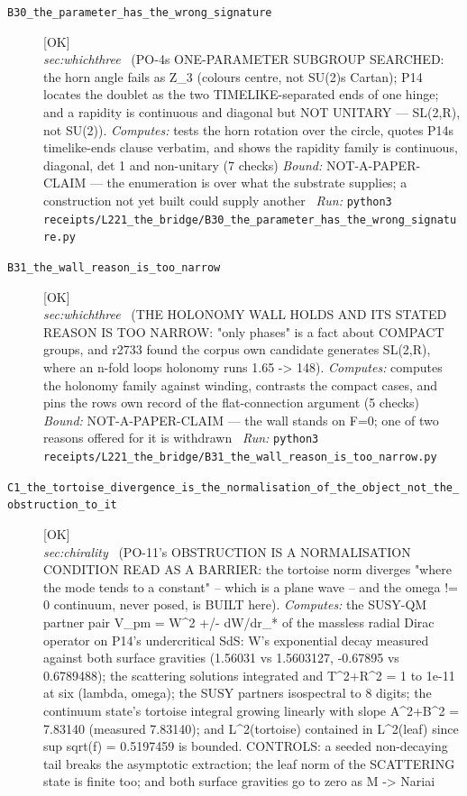 \begin{description}
\item[\label{rcpt:B30_the_parameter_has_the_wrong_signature}\texttt{B30\_the\_parameter\_has\_the\_wrong\_signature}]\hfill\textsf{[OK]}\\
\textit{sec:whichthree} \ (PO-4s ONE-PARAMETER SUBGROUP SEARCHED: the horn angle fails as Z\_3 (colours centre, not SU(2)s Cartan); P14 locates the doublet as the two TIMELIKE-separated ends of one hinge; and a rapidity is continuous and diagonal but NOT UNITARY --- SL(2,R), not SU(2)). 
\emph{Computes:} tests the horn rotation over the circle, quotes P14s timelike-ends clause verbatim, and shows the rapidity family is continuous, diagonal, det 1 and non-unitary (7 checks)
 \emph{Bound:} NOT-A-PAPER-CLAIM --- the enumeration is over what the substrate supplies; a construction not yet built could supply another
\ \emph{Run:} \texttt{python3 receipts/L221\_the\_bridge/B30\_the\_parameter\_has\_the\_wrong\_signature.py}
\item[\label{rcpt:B31_the_wall_reason_is_too_narrow}\texttt{B31\_the\_wall\_reason\_is\_too\_narrow}]\hfill\textsf{[OK]}\\
\textit{sec:whichthree} \ (THE HOLONOMY WALL HOLDS AND ITS STATED REASON IS TOO NARROW: "only phases" is a fact about COMPACT groups, and r2733 found the corpus own candidate generates SL(2,R), where an n-fold loops holonomy runs 1.65 -> 148). 
\emph{Computes:} computes the holonomy family against winding, contrasts the compact cases, and pins the rows own record of the flat-connection argument (5 checks)
 \emph{Bound:} NOT-A-PAPER-CLAIM --- the wall stands on F=0; one of two reasons offered for it is withdrawn
\ \emph{Run:} \texttt{python3 receipts/L221\_the\_bridge/B31\_the\_wall\_reason\_is\_too\_narrow.py}
\item[\label{rcpt:C1_the_tortoise_divergence_is_the_normalisation_of_the_object_not_the_obstruction_to_it}\texttt{C1\_the\_tortoise\_divergence\_is\_the\_normalisation\_of\_the\_object\_not\_the\_obstruction\_to\_it}]\hfill\textsf{[OK]}\\
\textit{sec:chirality} \ (PO-11's OBSTRUCTION IS A NORMALISATION CONDITION READ AS A BARRIER: the tortoise norm diverges "where the mode tends to a constant" -- which is a plane wave -- and the omega != 0 continuum, never posed, is BUILT here). 
\emph{Computes:} the SUSY-QM partner pair V\_pm = W\textasciicircum{}2 +/- dW/dr\_* of the massless radial Dirac operator on P14's undercritical SdS: W's exponential decay measured against both surface gravities (1.56031 vs 1.5603127, -0.67895 vs 0.6789488); the scattering solutions integrated and \textbar{}T\textbar{}\textasciicircum{}2+\textbar{}R\textbar{}\textasciicircum{}2 = 1 to 1e-11 at six (lambda, omega); the SUSY partners isospectral to 8 digits; the continuum state's tortoise integral growing linearly with slope \textbar{}A\textbar{}\textasciicircum{}2+\textbar{}B\textbar{}\textasciicircum{}2 = 7.83140 (measured 7.83140); and L\textasciicircum{}2(tortoise) contained in L\textasciicircum{}2(leaf) since sup sqrt(f) = 0.5197459 is bounded. CONTROLS: a seeded non-decaying tail breaks the asymptotic extraction; the leaf norm of the SCATTERING state is finite too; and both surface gravities go to zero as M -> Nariai

\end{description}
